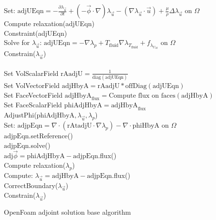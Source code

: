 \documentclass[10pt]{article} %
\begin{document}
\begin{center}
\begin{algorithm}[H]
	\SetAlgoLined
	\KwData{}
	{
		{
			Set: $\text{adjUEqn} = -\frac{\partial \lambda_{\vec{u}}}{\partial t}+(-\vec{\phi}\cdot\nabla) \lambda_{\vec{u}} - \left(\nabla \lambda_{\vec{u}} \cdot \vec{u}\right) + \frac{\mu}{\rho} \Delta \lambda_{\vec{u}}$ \quad on $\Omega$\\
			Compute relaxation(adjUEqn)\\
			Constraint(adjUEqn)\\
			Solve for $\lambda_{\vec{u}}$: $\text{adjUEqn} = - \nabla\lambda_p + T_{\text{fluid}} \nabla \lambda_{T_{\text{fluid}}} + f_{\lambda_{U_M}}$ \quad on $\Omega$\\
			Constrain($\lambda_{\vec{u}}$)\\
			\quad \\
			Set VolScalarField $\text{rAadjU} =  \frac{1}{\text{diag}(\text{adjUEqn})}$\\
			Set VolVectorField $\text{adjHbyA} =  \text{rAadjU}*\text{offDiag}(\text{adjUEqn})$\\
			\quad Set FaceVectorField $\text{adjHbyA}_{\text{flux}} =  \text{Compute flux on faces}(\text{adjHbyA})$\\
			Set FaceScalarField $\text{phiAdjHbyA} = \text{adjHbyA}_{\text{flux}} $\\
			AdjustPhi($\text{phiAdjHbyA}, \lambda_{\vec{u}},\lambda_p$)\\
			
			{
				Set: $\text{adjpEqn} = \nabla \cdot \left(\text{rAtadjU} \cdot \nabla \lambda_p\right) - \nabla \cdot \text{phiHbyA} $ \quad on $\Omega$\\
				$\text{adjpEqn}.$setReference()\\
				$\text{adjpEqn}.$solve()\\
				
				{
					$\text{adj}\vec{\phi} = \text{phiAdjHbyA} - \text{adjpEqn}$.flux()\\
				}
			}
			Compute relaxation($\lambda_p$)\\
			Compute: $\lambda_{\vec{u}} = \text{adjHbyA} - \text{adjpEqn}$.flux()\\
			CorrectBoundary($\lambda_{\vec{u}}$)\\
			Constrain($\lambda_{\vec{u}}$)
		}
	}
	\caption{OpenFoam adjoint solution base algorithm}
\end{algorithm}


\end{center}
\end{document}
